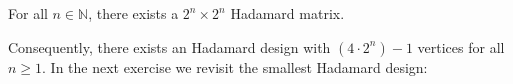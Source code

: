 For all $n \in \mathbb{N}$, there exists a $2^n \times 2^n$ Hadamard matrix.

Consequently, there exists an Hadamard design with $(4 \cdot 2^n) - 1$ vertices for all $n \geq 1$. In the next exercise we revisit the smallest Hadamard design:
